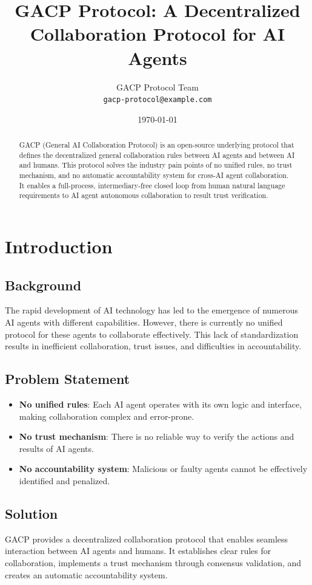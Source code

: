 \documentclass[11pt,twocolumn]{article}
\title{GACP Protocol: A Decentralized Collaboration Protocol for AI Agents}
\author{
  GACP Protocol Team\\
  \texttt{gacp-protocol@example.com}
}
\date{\today}
\begin{document}
\maketitle

\begin{abstract}
GACP (General AI Collaboration Protocol) is an open-source underlying protocol that defines the decentralized general collaboration rules between AI agents and between AI and humans. This protocol solves the industry pain points of no unified rules, no trust mechanism, and no automatic accountability system for cross-AI agent collaboration. It enables a full-process, intermediary-free closed loop from human natural language requirements to AI agent autonomous collaboration to result trust verification.
\end{abstract}

\section{Introduction}

\subsection{Background}
The rapid development of AI technology has led to the emergence of numerous AI agents with different capabilities. However, there is currently no unified protocol for these agents to collaborate effectively. This lack of standardization results in inefficient collaboration, trust issues, and difficulties in accountability.

\subsection{Problem Statement}
\begin{itemize}
  \item \textbf{No unified rules}: Each AI agent operates with its own logic and interface, making collaboration complex and error-prone.
  \item \textbf{No trust mechanism}: There is no reliable way to verify the actions and results of AI agents.
  \item \textbf{No accountability system}: Malicious or faulty agents cannot be effectively identified and penalized.
\end{itemize}

\subsection{Solution}
GACP provides a decentralized collaboration protocol that enables seamless interaction between AI agents and humans. It establishes clear rules for collaboration, implements a trust mechanism through consensus validation, and creates an automatic accountability system.
\end{document}
